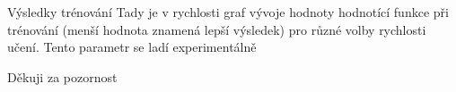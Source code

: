 \documentclass[aspectratio=1610]{beamer}
\begin{document}
\begin{frame}{Výsledky trénování}
Tady je v rychlosti graf vývoje hodnoty hodnotící funkce při trénování (menší hodnota znamená lepší výsledek) pro různé volby rychlosti učení. Tento parametr se ladí experimentálně
\end{frame}
\begin{frame}{}
	\centering
	{\Large Děkuji za pozornost}	
\end{frame}
\end{document}
